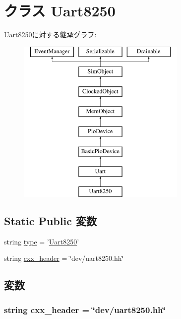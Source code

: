 \hypertarget{classUart_1_1Uart8250}{
\section{クラス Uart8250}
\label{classUart_1_1Uart8250}
}
Uart8250に対する継承グラフ:\begin{figure}[H]
\begin{center}
\leavevmode
\includegraphics[height=8cm]{classUart_1_1Uart8250}
\end{center}
\end{figure}
\subsection*{Static Public 変数}
\begin{DoxyCompactItemize}
\item 
string \hyperlink{classUart_1_1Uart8250_acce15679d830831b0bbe8ebc2a60b2ca}{type} = '\hyperlink{classUart_1_1Uart8250}{Uart8250}'
\item 
string \hyperlink{classUart_1_1Uart8250_a17da7064bc5c518791f0c891eff05fda}{cxx\_\-header} = \char`\"{}dev/uart8250.hh\char`\"{}
\end{DoxyCompactItemize}


\subsection{変数}
\hypertarget{classUart_1_1Uart8250_a17da7064bc5c518791f0c891eff05fda}{
\subsubsection[{cxx\_\-header}]{\setlength{\rightskip}{0pt plus 5cm}string {\bf cxx\_\-header} = \char`\"{}dev/uart8250.hh\char`\"{}}}
\label{classUart_1_1Uart8250_a17da7064bc5c518791f0c891eff05fda}


